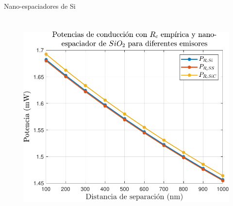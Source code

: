\documentclass[spanish,a4paper]{beamer}%
\begin{document}
\begin{frame}{Nano-espaciadores de Si}
{\begin{columns}
\begin{figure}[h]
										\includegraphics[width=\columnwidth]{Prc_XxSiO2Ge}%
								\label{fig:Prc_XxSiO2Ge}%
						\end{figure}
						\vfill
				\end{columns}				
				\vfill
		}
		
\end{frame}
\end{document}
